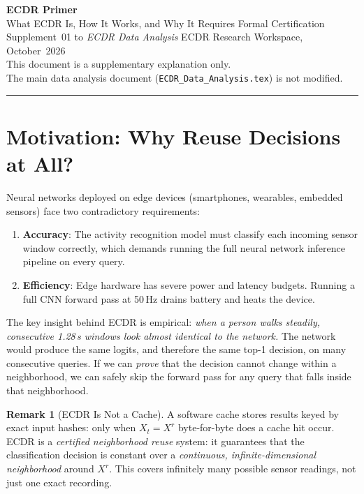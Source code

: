 \documentclass[11pt, a4paper]{article}
\theoremstyle{definition}
\newtheorem{remark}{Remark}[section]
\theoremstyle{plain}
\newcommand{\code}[1]{\texttt{#1}}
\begin{document}
\begin{center}
  {\LARGE\bfseries\color{teal} ECDR Primer}\\[0.5em]
  {\large\color{muted} What ECDR Is, How It Works, and Why It Requires Formal Certification}\\[1.2em]
  {\normalsize Supplement~01 to \textit{ECDR Data Analysis} \textbar{} ECDR Research Workspace, October~2026}\\[0.3em]
  {\small\color{muted}
    This document is a supplementary explanation only. \\
    The main data analysis document (\code{ECDR\_Data\_Analysis.tex}) is not modified.}
\end{center}

\vspace{1em}
\hrule
\vspace{1em}

\tableofcontents
\clearpage

\section{Motivation: Why Reuse Decisions at All?}

Neural networks deployed on edge devices (smartphones, wearables, embedded sensors)
face two contradictory requirements:

\begin{enumerate}
  \item \textbf{Accuracy}: The activity recognition model must classify each incoming
        sensor window correctly, which demands running the full neural network inference
        pipeline on every query.
  \item \textbf{Efficiency}: Edge hardware has severe power and latency budgets.
        Running a full CNN forward pass at 50\,Hz drains battery and heats the device.
\end{enumerate}

The key insight behind ECDR is empirical: \emph{when a person walks steadily, consecutive
1.28\,s windows look almost identical to the network.} The network would produce the same
logits, and therefore the same top-1 decision, on many consecutive queries. If we can
\emph{prove} that the decision cannot change within a neighborhood, we can safely skip the
forward pass for any query that falls inside that neighborhood.

\begin{remark}[ECDR Is Not a Cache]
  A software cache stores results keyed by exact input hashes: only when
  $X_t = X^r$ byte-for-byte does a cache hit occur. ECDR is a \emph{certified
  neighborhood reuse} system: it guarantees that the classification
  decision is constant over a \emph{continuous, infinite-dimensional neighborhood}
  around $X^r$. This covers infinitely many possible sensor readings, not just
  one exact recording.
\end{remark}
\end{document}
